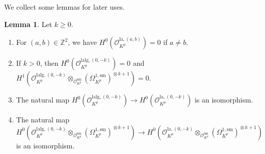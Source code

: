\documentclass{article}
\theoremstyle{definition}
\newtheorem{lemma}[theorem]{Lemma}
\def\calO{\mathcal{O}}
\def\bbZ{\mathbb{Z}}
\DeclareMathOperator{\ox}{\otimes}
\def\lan{\mathrm{la}}
\def\sm{\mathrm{sm}}
\def\lalg{\mathrm{lalg}}
\begin{document}
We collect some lemmas for later uses.
\begin{lemma}\label{lem:H0vanish}
    Let $k\geq 0$.
    \begin{enumerate}[(1)]
        \item For $(a,b)\in\bbZ^2$, we have $H^0(\calO^{\lan,(a,b)}_{K^p})=0$ if $a\neq b$.
        \item If $k>0$, then $H^0(\calO_{K^p}^{\lalg,(0,-k)})=0$ and $H^1(\calO_{K^p}^{\lalg,(0,-k)}\ox_{\calO_{K^p}^{\sm}}(\Omega_{K^p}^{1,\sm})^{\ox k+1})=0$.
        \item The natural map $H^0(\calO_{K^p}^{\lalg,(0,-k)})\to H^0(\calO_{K^p}^{\lan,(0,-k)})$ is an isomorphism. 
        \item The natural map $H^0(\calO_{K^p}^{\lalg,(0,-k)}\ox_{\calO_{K^p}^{\sm}}(\Omega_{K^p}^{1,\sm})^{\ox k+1})\to H^0(\calO_{K^p}^{\lan,(0,-k)}\ox_{\calO_{K^p}^{\sm}}(\Omega_{K^p}^{1,\sm})^{\ox k+1})$ is an isomorphism.
    \end{enumerate}
\end{lemma}
\end{document}
